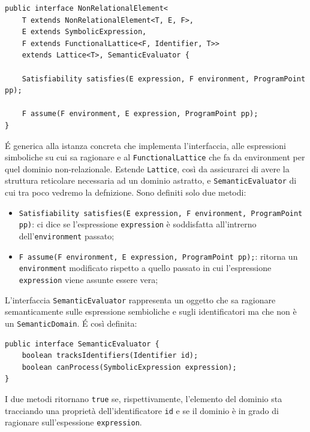 \begin{lstlisting}[belowskip=-1.1 \baselineskip]
public interface NonRelationalElement<
    T extends NonRelationalElement<T, E, F>,
    E extends SymbolicExpression,
    F extends FunctionalLattice<F, Identifier, T>>
    extends Lattice<T>, SemanticEvaluator {

    Satisfiability satisfies(E expression, F environment, ProgramPoint pp);
    
    F assume(F environment, E expression, ProgramPoint pp);
}
\end{lstlisting}

\'E generica alla istanza concreta che implementa l'interfaccia, alle espressioni simboliche su cui sa ragionare e al \texttt{FunctionalLattice} che fa da environment per quel dominio non-relazionale. Estende \texttt{Lattice}, così da assicurarci di avere la struttura reticolare necessaria ad un dominio astratto, e \texttt{SemanticEvaluator} di cui tra poco vedremo la defnizione. Sono definiti solo due metodi: 
\begin{itemize}
    \item \texttt{Satisfiability satisfies(E expression, F environment, ProgramPoint pp)}: ci dice se l'espressione \texttt{expression} è soddisfatta all'intrerno dell'\texttt{environment} passato; 
    \item \texttt{F assume(F environment, E expression, ProgramPoint pp);}: ritorna un \texttt{environment} modificato rispetto a quello passato in cui l'espressione \texttt{expression} viene assunte essere vera;
\end{itemize}
L'interfaccia \texttt{SemanticEvaluator} rappresenta un oggetto che sa ragionare semanticamente sulle espressione sembioliche e sugli identificatori ma che non è un \texttt{SemanticDomain}. \'E così definita:
\begin{lstlisting}[belowskip=-1.1 \baselineskip]
public interface SemanticEvaluator {
    boolean tracksIdentifiers(Identifier id);
    boolean canProcess(SymbolicExpression expression);
}
\end{lstlisting}
I due metodi ritornano \texttt{true} se, rispettivamente, l'elemento del dominio sta tracciando una proprietà dell'identificatore \texttt{id} e se il dominio è in grado di ragionare sull'espessione \texttt{expression}.


